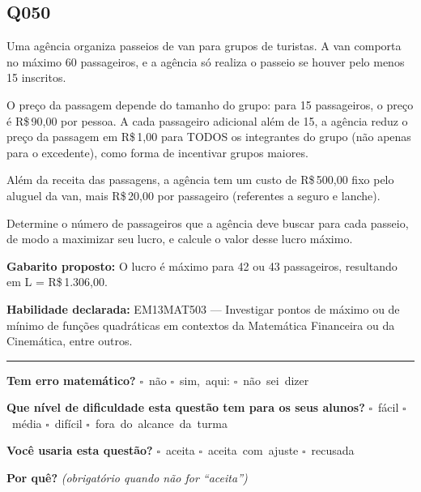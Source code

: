 \documentclass[11pt,a4paper]{article}
\begin{document}
\begin{samepage}
\subsection*{Q050}
Uma agência organiza passeios de van para grupos de turistas. A van comporta no máximo 60 passageiros, e a agência só realiza o passeio se houver pelo menos 15 inscritos.

O preço da passagem depende do tamanho do grupo: para 15 passageiros, o preço é R\$\,90,00 por pessoa. A cada passageiro adicional além de 15, a agência reduz o preço da passagem em R\$\,1,00 para TODOS os integrantes do grupo (não apenas para o excedente), como forma de incentivar grupos maiores.

Além da receita das passagens, a agência tem um custo de R\$\,500,00 fixo pelo aluguel da van, mais R\$\,20,00 por passageiro (referentes a seguro e lanche).

Determine o número de passageiros que a agência deve buscar para cada passeio, de modo a maximizar seu lucro, e calcule o valor desse lucro máximo.

\textbf{Gabarito proposto:} O lucro é máximo para 42 ou 43 passageiros, resultando em L = R\$\,1.306,00.

\textbf{Habilidade declarada:} EM13MAT503 --- Investigar pontos de máximo ou de mínimo de funções quadráticas em contextos da Matemática Financeira ou da Cinemática, entre outros.
\end{samepage}

\noindent\rule{\linewidth}{0.4pt}
\textbf{Tem erro matemático?}\quad
\mbox{$\square$~não} \quad \mbox{$\square$~sim, aqui:} \underline{\hspace{5cm}}
\quad \mbox{$\square$~não sei dizer}

\textbf{Que nível de dificuldade esta questão tem para os seus alunos?}\quad
\mbox{$\square$~fácil} \quad \mbox{$\square$~média} \quad
\mbox{$\square$~difícil} \quad \mbox{$\square$~fora do alcance da turma}

\textbf{Você usaria esta questão?}\quad
\mbox{$\square$~aceita} \quad \mbox{$\square$~aceita com ajuste} \quad
\mbox{$\square$~recusada}

\textbf{Por quê?} \emph{(obrigatório quando não for ``aceita'')}

\underline{\hspace{\linewidth}}

\underline{\hspace{\linewidth}}
\vspace{0.6em}
\end{document}

